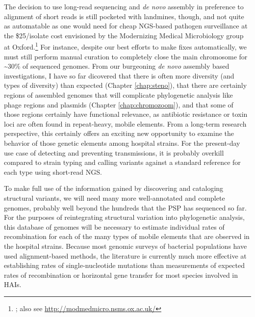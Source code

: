 The decision to use long-read sequencing and \emph{de novo} assembly in preference to alignment of short reads is still pocketed with landmines, though, and not quite as automatable as one would need for cheap NGS-based pathogen surveillance at the \$25/isolate cost envisioned by the Modernizing Medical Microbiology group at Oxford.\footnote{\textcite{Koser2012}; also see \url{http://modmedmicro.nsms.ox.ac.uk/}} For instance, despite our best efforts to make fixes automatically, we must still perform manual curation to completely close the main chromosome for \textasciitilde 30\% of sequenced genomes. From our burgeoning \emph{de novo} assembly based investigations, I have so far dicovered that there is often more diversity (and types of diversity) than expected (Chapter \ref{chap:steno}), that there are certainly regions of assembled genomes that will complicate phylogenetic analysis like phage regions and plasmids (Chapter \ref{chap:chromozoom}), and that some of those regions certainly have functional relevance, as antibiotic resistance or toxin loci are often found in repeat-heavy, mobile elements.\autocite{Knight2015,Casas2006,Chen2014} From a long-term research perspective, this certainly offers an exciting new opportunity to examine the behavior of those genetic elements among hospital strains. For the present-day use case of detecting and preventing transmissions, it is probably overkill compared to strain typing and calling variants against a standard reference for each type using short-read NGS.

To make full use of the information gained by discovering and cataloging structural variants, we will need many more well-annotated and complete genomes, probably well beyond the hundreds that the PSP has sequenced so far. For the purposes of reintegrating structural variation into phylogenetic analysis, this database of genomes will be necessary to estimate individual rates of recombination for each of the many types of mobile elements that are observed in the hospital strains. Because most genomic surveys of bacterial populations have used alignment-based methods, the literature is currently much more effective at establishing rates of single-nucleotide mutations than measurements of expected rates of recombination or horizontal gene transfer for most species involved in HAIs.

